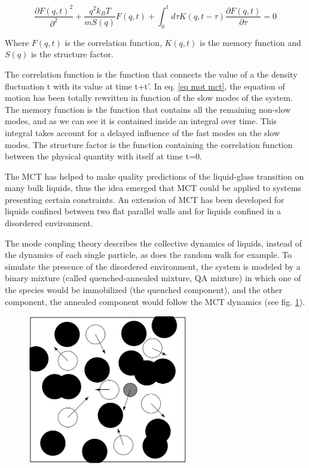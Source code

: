 \documentclass[a4paper,12pt]{article}
\newcommand{\jline}{\vspace{10pt}}
\begin{document}
\begin{equation}
\label{eq mot mct}
\frac{\partial F(q,t)^2}{\partial^2}+\frac{q^2k_BT}{mS(q)}F(q,t)+\int_0^t d\tau K(q,t-\tau) \frac{\partial F(q,t)}{\partial \tau}=0
\end{equation}

Where $F(q,t)$ is the correlation function, $K(q,t)$ is the memory function and $S(q)$ is the structure factor.\jline

The correlation function is the function that connects the value of a the density fluctuation t with its value at time t+t'.
In eq. \ref{eq mot mct}, the equation of motion has been totally rewritten in function of the slow modes of the system. The memory function
is the function that contains all the remaining non-slow modes, and as we can see it is contained inside an integral over time. This 
integral takes account for a delayed influence of the fast modes on the slow modes.
The structure factor is the function containing the correlation function between the physical quantity with itself at time t=0.


The MCT has helped to make quality predictions of the liquid-glass transition on many bulk liquids, thus the idea emerged that MCT could
be applied to systems presenting certain constraints. An extension of MCT has been developed for liquids confined between two flat parallel
walls \cite{Lang2012} and for liquids confined in a disordered environment.\jline

The mode coupling theory describes the collective dynamics of liquids, instead of the dynamics of each single particle, as does the random
walk for example. To simulate the presence of the disordered environment, the system is modeled by a binary mixture (called quenched-annealed
mixture, QA mixture) in which one of the species would be immobilized (the quenched component), and the other component, the annealed 
component would follow the MCT dynamics (see fig. \ref{qa mixture}).

\begin{figure}[htbp]
\centering
\subfigure
{\includegraphics[width=7cm]{pics/qa_mixtures.png}}
\caption{}
\label{qa mixture}
\end{figure}

\newpage


\end{document}
